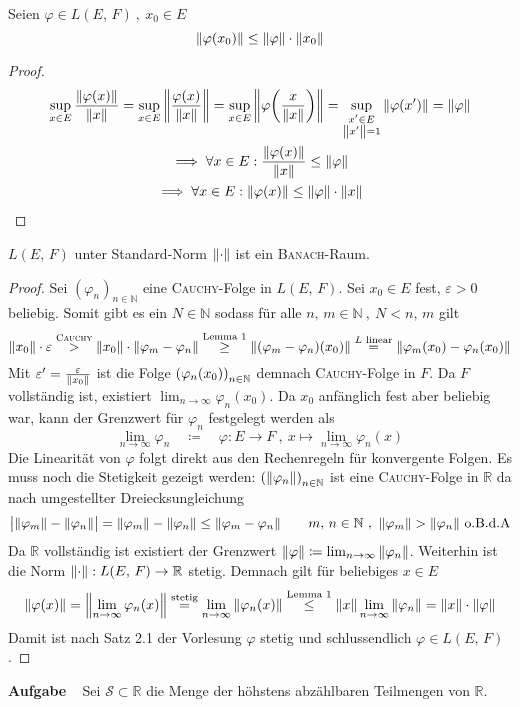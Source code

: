 \documentclass[a4paper, 12pt]{scrartcl}
\let\phi\varphi
\let\epsilon\varepsilon
\newcounter{taski}
\newcommand{\task}{\stepcounter{taski}\textbf{Aufgabe \arabic{taski}}~}
\begin{document}
\begin{lemma}
Seien $\phi \in L(E,\,F) ~,~ x_0 \in E$
\[ \norm{\phi(x_0)} \leq \norm{\phi}\cdot\norm{x_0} \]
\end{lemma}
\begin{proof}
\begin{gather*}
    \sup_{x \in E} \frac{\norm{\phi(x)}}{\norm{x}}
    = \sup_{x \in E} \norm{\frac{\phi(x)}{\norm{x}}}
    = \sup_{x \in E} \norm{\phi\qty(\frac{x}{\norm{x}})}
    = \sup_{\substack{x' \in E\\\norm{x'}=1}} \norm{\phi(x')}
    = \norm{\phi}
    \\
    \implies \forall x \in E : \frac{\norm{\phi(x)}}{\norm{x}} \leq \norm{\phi} \\
    \implies \forall x \in E : \norm{\phi(x)} \leq \norm{\phi} \cdot \norm{x}
\end{gather*}
\end{proof}
\newpage
\begin{theorem}
    $L(E,\, F)$ unter Standard-Norm $\norm{\cdot}$ ist ein \textsc{Banach}-Raum.
\end{theorem}
\begin{proof}
Sei $(\phi_n)_{n \in \mathbb{N}}$ eine \textsc{Cauchy}-Folge in $L(E,\, F)$. Sei $x_0 \in E$ fest, $\epsilon > 0$ beliebig. Somit gibt es ein $N \in \mathbb{N}$ sodass für alle $n,\, m \in \mathbb{N} ~,~ N < n,\, m$ gilt
\[
    \norm{x_0}\cdot\epsilon
    \stackrel{\textsc{Cauchy}}> \norm{x_0}\cdot\norm{\phi_m-\phi_n} 
    \stackrel{\text{Lemma 1}}\geq \norm{(\phi_m-\phi_n)(x_0)}
    \stackrel{L \text{ linear}}= \norm{\phi_m(x_0) - \phi_n(x_0)}
\]
Mit $\epsilon' = \frac\epsilon{\norm{x_0}}$ ist die Folge $\qty(\phi_n(x_0))_{n \in \mathbb{N}}$ demnach \textsc{Cauchy}-Folge in $F$. Da $F$ vollständig ist, existiert $\lim_{n \rightarrow \infty} \phi_n(x_0)$. Da $x_0$ anfänglich fest aber beliebig war, kann der Grenzwert für $\phi_n$ festgelegt werden als
\[ \lim_{n \rightarrow \infty}\phi_n \quad\coloneqq\quad \phi : E \rightarrow F ~,~ x \mapsto \lim_{n \rightarrow \infty} \phi_n(x) \]
Die Linearität von $\phi$ folgt direkt aus den Rechenregeln für konvergente Folgen. Es muss noch die Stetigkeit gezeigt werden: $\qty(\norm{\phi_n})_{n \in \mathbb{N}}$ ist eine \textsc{Cauchy}-Folge in $\mathbb{R}$ da nach umgestellter Dreiecksungleichung
\[ \abs\big{\norm{\phi_m} - \norm{\phi_n}} = \norm{\phi_m} - \norm{\phi_n} \leq \norm{\phi_m - \phi_n} \qquad m,\, n \in \mathbb{N} ~,~ \norm{\phi_m} > \norm{\phi_n} \text{ o.B.d.A}\]
Da $\mathbb{R}$ vollständig ist existiert der Grenzwert $\norm{\phi} \coloneqq \lim_{n \rightarrow \infty} \norm{\phi_n}$. Weiterhin ist die Norm $\norm{\cdot} : L(E,\, F) \rightarrow \mathbb{R}$ stetig. Demnach gilt für beliebiges $x \in E$
\[
    \norm{\phi(x)} = \norm{\lim_{n\rightarrow\infty}\phi_n(x)}
    \stackrel{\text{stetig}}= \lim_{n\rightarrow\infty}\norm{\phi_n(x)} 
    \stackrel{\text{Lemma 1}}\leq \norm{x}\lim_{n\rightarrow\infty}\norm{\phi_n}
    = \norm{x}\cdot\norm{\phi}
\]
Damit ist nach Satz 2.1 der Vorlesung $\phi$ stetig und schlussendlich $\phi \in L(E,\, F)$.
\end{proof}
\task
Sei $\mathscr{S} \subset \mathbb{R}$ die Menge der höhstens abzählbaren Teilmengen von $\mathbb{R}$.
\end{document}
